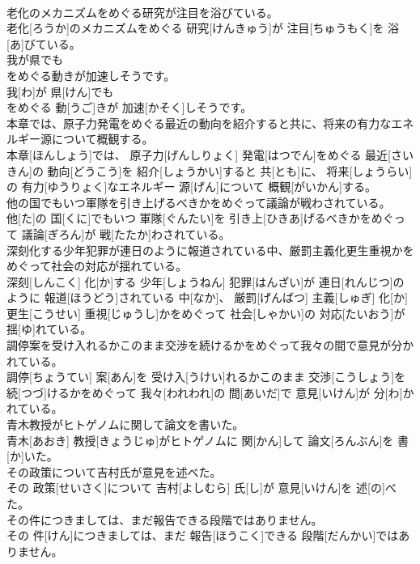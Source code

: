 \documentclass[8pt]{extreport}
\begin{document}
\begin{CJK}{UTF8}{min}
\\	老化のメカニズムをめぐる研究が注目を浴びている。	
\\	老化[ろうか]のメカニズムをめぐる 研究[けんきゅう]が 注目[ちゅうもく]を 浴[あ]びている。
\\	我が県でも
\\	をめぐる動きが加速しそうです。	
\\	我[わ]が 県[けん]でも 
\\	をめぐる 動[うご]きが 加速[かそく]しそうです。
\\	本章では、原子力発電をめぐる最近の動向を紹介すると共に、将来の有力なエネルギー源について概観する。	
\\	本章[ほんしょう]では、 原子力[げんしりょく] 発電[はつでん]をめぐる 最近[さいきん]の 動向[どうこう]を 紹介[しょうかい]すると 共[とも]に、 将来[しょうらい]の 有力[ゆうりょく]なエネルギー 源[げん]について 概観[がいかん]する。
\\	他の国でもいつ軍隊を引き上げるべきかをめぐって議論が戦わされている。	
\\	他[た]の 国[くに]でもいつ 軍隊[ぐんたい]を 引き上[ひきあ]げるべきかをめぐって 議論[ぎろん]が 戦[たたか]わされている。
\\	深刻化する少年犯罪が連日のように報道されている中、厳罰主義化更生重視かをめぐって社会の対応が揺れている。	
\\	深刻[しんこく] 化[か]する 少年[しょうねん] 犯罪[はんざい]が 連日[れんじつ]のように 報道[ほうどう]されている 中[なか]、 厳罰[げんばつ] 主義[しゅぎ] 化[か] 更生[こうせい] 重視[じゅうし]かをめぐって 社会[しゃかい]の 対応[たいおう]が 揺[ゆ]れている。
\\	調停案を受け入れるかこのまま交渉を続けるかをめぐって我々の間で意見が分かれている。	
\\	調停[ちょうてい] 案[あん]を 受け入[うけい]れるかこのまま 交渉[こうしょう]を 続[つづ]けるかをめぐって 我々[われわれ]の 間[あいだ]で 意見[いけん]が 分[わ]かれている。
\\	青木教授がヒトゲノムに関して論文を書いた。	
\\	青木[あおき] 教授[きょうじゅ]がヒトゲノムに 関[かん]して 論文[ろんぶん]を 書[か]いた。
\\	その政策について吉村氏が意見を述べた。	
\\	その 政策[せいさく]について 吉村[よしむら] 氏[し]が 意見[いけん]を 述[の]べた。
\\	その件につきましては、まだ報告できる段階ではありません。	
\\	その 件[けん]につきましては、まだ 報告[ほうこく]できる 段階[だんかい]ではありません。

\end{CJK}
\end{document}
